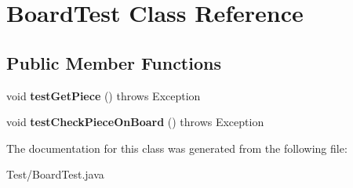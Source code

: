 \hypertarget{class_board_test}{}\section{Board\+Test Class Reference}
\label{class_board_test}
\subsection*{Public Member Functions}
\begin{DoxyCompactItemize}
\item 
\hypertarget{class_board_test_a664f63b96bc863e0f8f0a5c45744b74d}{}void {\bfseries test\+Get\+Piece} ()  throws Exception \label{class_board_test_a664f63b96bc863e0f8f0a5c45744b74d}

\item 
\hypertarget{class_board_test_adaac6704ceb2345fe9ce1945edc7480a}{}void {\bfseries test\+Check\+Piece\+On\+Board} ()  throws Exception \label{class_board_test_adaac6704ceb2345fe9ce1945edc7480a}

\end{DoxyCompactItemize}


The documentation for this class was generated from the following file\+:\begin{DoxyCompactItemize}
\item 
Test/Board\+Test.\+java\end{DoxyCompactItemize}
